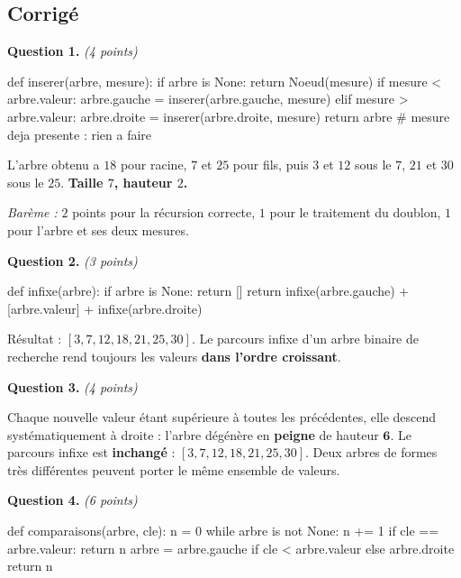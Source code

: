 \subsection*{Corrigé}

\textbf{Question 1.} \emph{(4 points)}

\begin{python}
def inserer(arbre, mesure):
    if arbre is None:
        return Noeud(mesure)
    if mesure < arbre.valeur:
        arbre.gauche = inserer(arbre.gauche, mesure)
    elif mesure > arbre.valeur:
        arbre.droite = inserer(arbre.droite, mesure)
    return arbre        # mesure deja presente : rien a faire
\end{python}

L'arbre obtenu a $18$ pour racine, $7$ et $25$ pour fils, puis $3$ et $12$ sous
le $7$, $21$ et $30$ sous le $25$. \textbf{Taille $7$, hauteur $2$.}

\medskip
\emph{Barème :} $2$ points pour la récursion correcte, $1$ pour le traitement
du doublon, $1$ pour l'arbre et ses deux mesures.

\medskip
\textbf{Question 2.} \emph{(3 points)}

\begin{python}
def infixe(arbre):
    if arbre is None:
        return []
    return infixe(arbre.gauche) + [arbre.valeur] + infixe(arbre.droite)
\end{python}

Résultat : $[3, 7, 12, 18, 21, 25, 30]$. Le parcours infixe d'un arbre binaire
de recherche rend toujours les valeurs \textbf{dans l'ordre croissant}.

\medskip
\textbf{Question 3.} \emph{(4 points)}

Chaque nouvelle valeur étant supérieure à toutes les précédentes, elle descend
systématiquement à droite : l'arbre dégénère en \textbf{peigne} de hauteur
$\mathbf{6}$. Le parcours infixe est \textbf{inchangé} : $[3, 7, 12, 18, 21,
25, 30]$. Deux arbres de formes très différentes peuvent porter le même
ensemble de valeurs.

\medskip
\textbf{Question 4.} \emph{(6 points)}

\begin{python}
def comparaisons(arbre, cle):
    n = 0
    while arbre is not None:
        n += 1
        if cle == arbre.valeur:
            return n
        arbre = arbre.gauche if cle < arbre.valeur else arbre.droite
    return n
\end{python}

